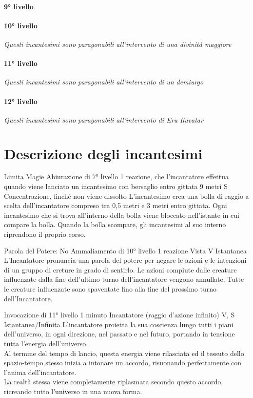 \paragraph{9° livello}
\paragraph{10° livello} \textit{Questi incantesimi sono paragonabili all'intervento di una divinità maggiore}
\paragraph{11° livello} \textit{Questi incantesimi sono paragonabili all'intervento di un demiurgo}
\paragraph{12° livello} \textit{Questi incantesimi sono paragonabili all'intervento di Eru Iluvatar}

\section{Descrizione degli incantesimi}

\DndSpellHeader%
  {Limita Magie}
  {Abiurazione di 7° livello}
  {1 reazione, che l'incantatore effettua quando viene lanciato un incantesimo con bersaglio entro gittata}
  {9 metri}
  {S}
  {Concentrazione, finché non viene dissolto}
L'incantesimo crea una bolla di raggio a scelta dell'incantatore compreso tra 0,5 metri e 3 metri entro gittata. Ogni incantesimo che si trova all'interno della bolla viene bloccato nell'istante in cui compare la bolla. Quando la bolla scompare, gli incantesimi al suo interno riprendono il proprio corso.

\DndSpellHeader%
  {Parola del Potere: No}
  {Ammaliamento di 10° livello}
  {1 reazione}
  {Vista}
  {V}
  {Istantanea}
L'Incantatore pronuncia una parola del potere per negare le azioni e le intenzioni di un gruppo di creture in grado di sentirlo.
Le azioni compiute dalle creature influenzate dalla fine dell'ultimo turno dell'incantatore vengono annullate.
Tutte le creature influenzate sono spaventate fino alla fine del prossimo turno dell'Incantatore.

{Invocazione di 11° livello}
{1 minuto}
{Incantatore (raggio d'azione infinito)}
{V, S}
{Istantanea/Infinita}
L'incantatore proietta la sua coscienza lungo tutti i piani dell'universo, in ogni direzione, nel passato e nel futuro, portando in tensione tutta l'energia dell'universo. \\ Al termine del tempo di lancio, questa energia viene rilasciata ed il tessuto dello spazio-tempo stesso inizia a intonare un accordo, risuonando perfettamente con l'anima dell'incantatore. \\ La realtà stessa viene completamente riplasmata secondo questo accordo, ricreando tutto l'universo in una nuova forma.


